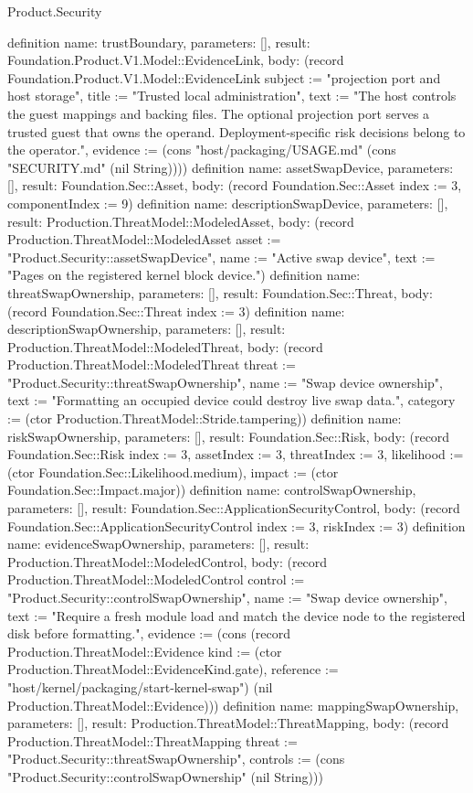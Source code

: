 \begin{lexlean}{Product.Security}
\begin{semanticmodule}
definition{
  name: trustBoundary, parameters: [], result: Foundation.Product.V1.Model::EvidenceLink,
  body: (record Foundation.Product.V1.Model::EvidenceLink {subject := "projection port and host storage", title := "Trusted local administration", text := "The host controls the guest mappings and backing files. The optional projection port serves a trusted guest that owns the operand. Deployment-specific risk decisions belong to the operator.", evidence := (cons "host/packaging/USAGE.md" (cons "SECURITY.md" (nil String)))})
}
definition{
  name: assetSwapDevice, parameters: [], result: Foundation.Sec::Asset,
  body: (record Foundation.Sec::Asset {index := 3, componentIndex := 9})
}
definition{
  name: descriptionSwapDevice, parameters: [], result: Production.ThreatModel::ModeledAsset,
  body: (record Production.ThreatModel::ModeledAsset {asset := "Product.Security::assetSwapDevice", name := "Active swap device", text := "Pages on the registered kernel block device."})
}
definition{
  name: threatSwapOwnership, parameters: [], result: Foundation.Sec::Threat,
  body: (record Foundation.Sec::Threat {index := 3})
}
definition{
  name: descriptionSwapOwnership, parameters: [], result: Production.ThreatModel::ModeledThreat,
  body: (record Production.ThreatModel::ModeledThreat {threat := "Product.Security::threatSwapOwnership", name := "Swap device ownership", text := "Formatting an occupied device could destroy live swap data.", category := (ctor Production.ThreatModel::Stride.tampering)})
}
definition{
  name: riskSwapOwnership, parameters: [], result: Foundation.Sec::Risk,
  body: (record Foundation.Sec::Risk {index := 3, assetIndex := 3, threatIndex := 3, likelihood := (ctor Foundation.Sec::Likelihood.medium), impact := (ctor Foundation.Sec::Impact.major)})
}
definition{
  name: controlSwapOwnership, parameters: [], result: Foundation.Sec::ApplicationSecurityControl,
  body: (record Foundation.Sec::ApplicationSecurityControl {index := 3, riskIndex := 3})
}
definition{
  name: evidenceSwapOwnership, parameters: [], result: Production.ThreatModel::ModeledControl,
  body: (record Production.ThreatModel::ModeledControl {control := "Product.Security::controlSwapOwnership", name := "Swap device ownership", text := "Require a fresh module load and match the device node to the registered disk before formatting.", evidence := (cons (record Production.ThreatModel::Evidence {kind := (ctor Production.ThreatModel::EvidenceKind.gate), reference := "host/kernel/packaging/start-kernel-swap"}) (nil Production.ThreatModel::Evidence))})
}
definition{
  name: mappingSwapOwnership, parameters: [], result: Production.ThreatModel::ThreatMapping,
  body: (record Production.ThreatModel::ThreatMapping {threat := "Product.Security::threatSwapOwnership", controls := (cons "Product.Security::controlSwapOwnership" (nil String))})
}
\end{semanticmodule}
\end{lexlean}
